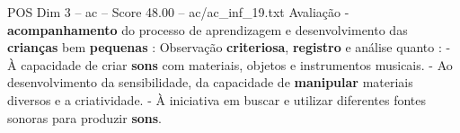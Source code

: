\begin{textsample}{POS Dim 3 – ac – Score 48.00 – ac/ac\_inf\_19.txt}
Avaliação - \textbf{acompanhamento} do processo de aprendizagem e desenvolvimento das \textbf{crianças} bem \textbf{pequenas} : Observação \textbf{criteriosa}, \textbf{registro} e análise quanto : - À capacidade de criar \textbf{sons} com materiais, objetos e instrumentos musicais. - Ao desenvolvimento da sensibilidade, da capacidade de \textbf{manipular} materiais diversos e a criatividade. - À iniciativa em buscar e utilizar diferentes fontes sonoras para produzir \textbf{sons}.

\end{textsample}

